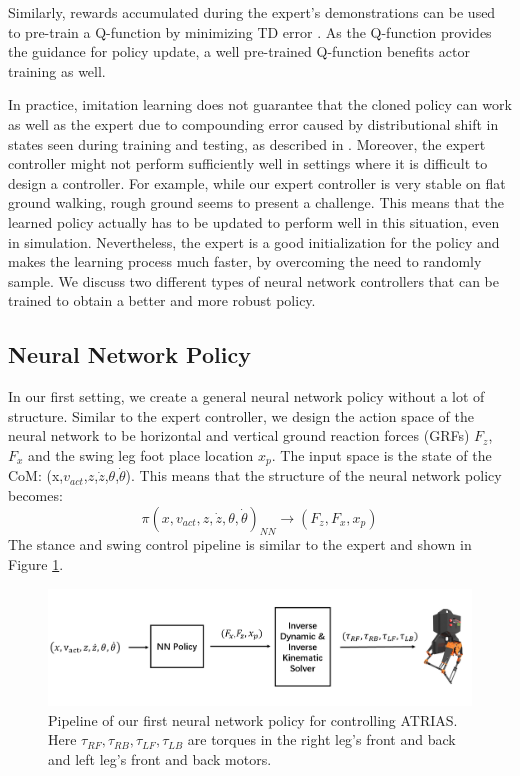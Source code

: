 Similarly, rewards accumulated during the expert's demonstrations can be used to pre-train a Q-function by minimizing TD error \citep{sendonaris2017learning}. As the Q-function provides the guidance for policy update, a well pre-trained Q-function benefits actor training as well. 

In practice, imitation learning does not guarantee that the cloned policy can work as well as the expert due to compounding error caused by distributional shift in states seen during training and testing, as described in  \cite{ross2010efficient}. Moreover, the expert controller might not perform sufficiently well in settings where it is difficult to design a controller. For example, while our expert controller is very stable on flat ground walking, rough ground seems to present a challenge. This means that the learned policy actually has to be updated to perform well in this situation, even in simulation. Nevertheless, the expert is a good initialization for the policy and makes the learning process much faster, by overcoming the need to randomly sample. We discuss two different types of neural network controllers that can be trained to obtain a better and more robust policy. 

\subsection{Neural Network Policy}
\label{NN_P}

In our first setting, we create a general neural network policy without a lot of structure. Similar to the expert controller, we design the action space of the neural network to be horizontal and vertical ground  reaction forces (GRFs) $F_z$, $F_x$ and the swing leg foot place location $x_p$. The input space is the state of the CoM:  (x,$v_{act}$,$z$,$\dot{z}$,$\theta$,$\dot{\theta}$). This means that the structure of the neural network policy becomes:
\begin{equation}
    \pi(x,v_{act},z,\dot{z},\theta,\dot{\theta})_{NN} \rightarrow  (F_z, F_x,x_p)
\end{equation}
The stance and swing control pipeline is similar to the expert and shown in Figure \ref{fig:NN_process}. %
\begin{figure}[!h]
	\centering
	\includegraphics[width=.7\textwidth]{./img/NN.PNG}
    \caption{Pipeline of our first neural network policy for controlling ATRIAS. Here $\tau_{RF},\tau_{RB},\tau_{LF},\tau_{LB}$ are torques in the right leg's front and back and left leg's front and back motors.}
    \label{fig:NN_process}
\end{figure}

